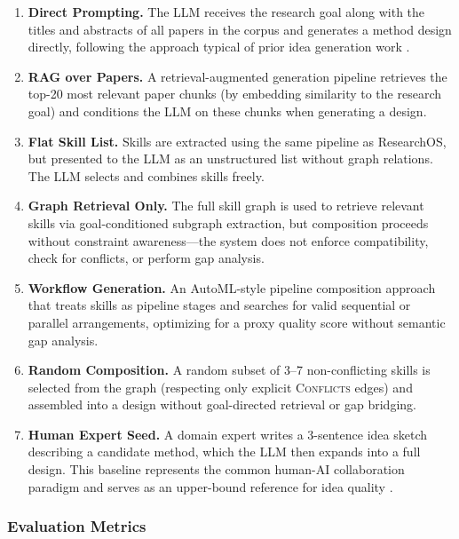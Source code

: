 \begin{enumerate}[label=\textbf{B\arabic*},leftmargin=2em]
    \item \textbf{Direct Prompting.} The LLM receives the research goal along with the titles and abstracts of all papers in the corpus and generates a method design directly, following the approach typical of prior idea generation work \cite{si2024llmideas}.
    \item \textbf{RAG over Papers.} A retrieval-augmented generation pipeline \cite{lewis2020rag} retrieves the top-20 most relevant paper chunks (by embedding similarity to the research goal) and conditions the LLM on these chunks when generating a design.
    \item \textbf{Flat Skill List.} Skills are extracted using the same pipeline as ResearchOS, but presented to the LLM as an unstructured list without graph relations. The LLM selects and combines skills freely.
    \item \textbf{Graph Retrieval Only.} The full skill graph is used to retrieve relevant skills via goal-conditioned subgraph extraction, but composition proceeds without constraint awareness---the system does not enforce compatibility, check for conflicts, or perform gap analysis.
    \item \textbf{Workflow Generation.} An AutoML-style pipeline composition approach \cite{hutter2019automl, chen2024automl} that treats skills as pipeline stages and searches for valid sequential or parallel arrangements, optimizing for a proxy quality score without semantic gap analysis.
    \item \textbf{Random Composition.} A random subset of 3--7 non-conflicting skills is selected from the graph (respecting only explicit \textsc{Conflicts} edges) and assembled into a design without goal-directed retrieval or gap bridging.
    \item \textbf{Human Expert Seed.} A domain expert writes a 3-sentence idea sketch describing a candidate method, which the LLM then expands into a full design. This baseline represents the common human-AI collaboration paradigm and serves as an upper-bound reference for idea quality \cite{si2024llmideas}.
\end{enumerate}

\subsubsection{Evaluation Metrics}
\label{subsubsec:metrics}

